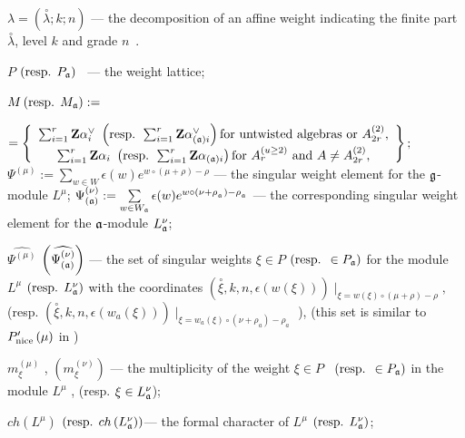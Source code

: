 \documentclass[a4paper,12pt]{article}
\theoremstyle{definition} \newtheorem{Def}{Definition}
\begin{document}
$\lambda =\left( \overset{\circ }{\lambda };k;n\right) $ --- the
decomposition of an affine weight indicating the finite part $\overset{\circ 
}{\lambda }$, level $k$ and grade $n$\ .

$P$ $\left( \text{resp. } P_{\frak{a}}\right) $ \ --- the weight lattice;

$M \left( \text{resp. }M_{\frak{a}}\right) :=$

\noindent $=\left\{ 
\begin{array}{c}
\sum_{i=1}^{r}\mathbf{Z}\alpha _{i}^{\vee }\text{ }\left( \text{resp. }%
\sum_{i=1}^{r}\mathbf{Z}\alpha _{\left( \frak{a}\right) i}^{\vee }\right) 
\text{for untwisted algebras or }A_{2r}^{\left( 2\right) }, \\ 
\sum_{i=1}^{r}\mathbf{Z}\alpha _{i}\text{ }\left( \text{resp. }\sum_{i=1}^{r}%
\mathbf{Z}\alpha _{\left( \frak{a}\right) i}\right) \text{for }A_{r}^{\left(
u\geq 2\right) }\text{ and }A\neq A_{2r}^{\left( 2\right) },
\end{array}
\right\} ;$
$\Psi ^{\left( \mu \right) }:=\sum\limits_{w\in W}\epsilon (w)e^{w\circ (\mu +\rho )-\rho }$ --- the singular weight element for the $\frak{g}$-module $L^{\mu }$;
$\Psi _{\left( \frak{a}\right) }^{\left( \nu \right) }:=\sum\limits_{w\in W_{\frak{a}}}\epsilon (w)e^{w\circ (\nu +\rho
_{_{\frak{a}}})-\rho _{_{\frak{a}}}}$ --- the corresponding singular weight
element for the $\frak{a}$-module $L_{\frak{a}}^{\nu }$;

$\widehat{\Psi ^{\left( \mu \right) }}$ $\left( \widehat{\Psi _{\left( \frak{%
a}\right) }^{\left( \nu \right) }}\right) $ --- the set of singular weights $%
\xi \in P$ $\left( \text{resp. }\in P_{\frak{a}}\right) $ for the module $%
L^{\mu }$ $\left( \text{resp. }L_{\frak{a}}^{\nu }\right) $ with the
coordinates $\left( \overset{\circ }{\xi },k,n,\epsilon \left( w\left( \xi
\right) \right) \right) \mid _{\xi =w\left( \xi \right) \circ (\mu +\rho
)-\rho },$ (resp. $\left( \overset{\circ }{\xi },k,n,\epsilon \left(
w_{a}\left( \xi \right) \right) \right) \mid _{\xi =w_{a}\left( \xi \right)
\circ (\nu +\rho _{a})-\rho _{a}}$ ), (this set is similar to $P_{\mathrm{%
nice}}^{\prime }\left( \mu \right) $ in \cite{wakimoto2001idl})

$m_{\xi }^{\left( \mu \right) }$ , $\left( m_{\xi }^{\left( \nu \right)
}\right) $ --- the multiplicity of the weight $\xi \in P$ \ $\left( \text{%
resp. }\in P_{\frak{a}}\right) $ in the module $L^{\mu }$ , (resp. $\xi \in
L_{\frak{a}}^{\nu } $);

$ch\left( L^{\mu }\right) $ $\left( \text{resp. }ch\left( L_{\frak{a}}^{\nu
}\right) \right) $--- the formal character of $L^{\mu }$ $\left( \text{resp. }%
L_{\frak{a}}^{\nu }\right) $;
\end{document}
